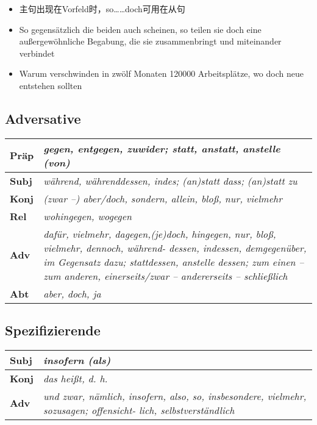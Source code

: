\documentclass[UTF8]{report}
\begin{document}
\begin{itemize}
    \item 主句出现在Vorfeld时，so……doch可用在从句
    \item So gegensätzlich die beiden auch scheinen, so teilen sie doch eine außergewöhnliche Begabung, die sie zusammenbringt und miteinander verbindet
    \item Warum verschwinden in zwölf Monaten 120000 Arbeitsplätze, wo doch neue entstehen sollten
\end{itemize}

\subsection{Adversative}
\begin{longtable}{|>{\raggedright\arraybackslash}p{1cm}|>{\raggedright\arraybackslash}p{12cm}|}

\hline
\textbf{Präp} & \textit{gegen, entgegen, zuwider; statt, anstatt, anstelle (von)} \\
\hline
\textbf{Subj} & \textit{während, währenddessen, indes; (an)statt dass; (an)statt zu} \\
\hline
\textbf{Konj} & \textit{(zwar --) aber/doch, sondern, allein, bloß, nur, vielmehr} \\
\hline
\textbf{Rel} & \textit{wohingegen, wogegen} \\
\hline
\textbf{Adv} & \textit{dafür, vielmehr, dagegen,(je)doch, hingegen, nur, bloß, vielmehr, dennoch, während- dessen, indessen, demgegenüber, im Gegensatz dazu; stattdessen, anstelle dessen; zum einen -- zum anderen, einerseits/zwar -- andererseits -- schließlich} \\
\hline
\textbf{Abt} & \textit{aber, doch, ja} \\
\hline
\end{longtable}

\subsection{Spezifizierende}
\begin{longtable}{|>{\raggedright\arraybackslash}p{1cm}|>{\raggedright\arraybackslash}p{12cm}|}

\hline
\textbf{Subj} & \textit{insofern (als)} \\
\hline
\textbf{Konj} & \textit{das heißt, d. h.} \\
\hline
\textbf{Adv} & \textit{und zwar, nämlich, insofern, also, so, insbesondere, vielmehr, sozusagen; offensicht- lich, selbstverständlich} \\
\hline

\end{longtable}
\end{document}
